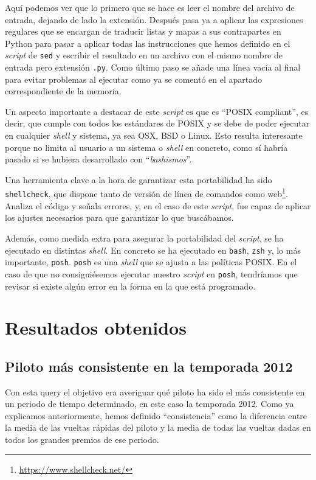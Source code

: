 \documentclass[12pt,twoside,titlepage]{report}
\newcommand{\quotes}[1]{``#1''}
\begin{document}
Aquí podemos ver que lo primero que se hace es leer el nombre del archivo de entrada, dejando de lado la extensión. Después pasa ya a aplicar las expresiones regulares que se encargan de traducir listas y mapas a sus contrapartes en Python para pasar a aplicar todas las instrucciones que hemos definido en el \textit{script} de \texttt{sed} y escribir el resultado en un archivo con el mismo nombre de entrada pero extensión \texttt{.py}. Como último paso se añade una línea vacía al final para evitar problemas al ejecutar como ya se comentó en el apartado correspondiente de la memoria.

Un aspecto importante a destacar de este \textit{script} es que es \quotes{POSIX compliant}, es decir, que cumple con todos los estándares de POSIX y se debe de poder ejecutar en cualquier \textit{shell} y sistema, ya sea OSX, BSD o Linux. Esto resulta interesante porque no limita al usuario a un sistema o \textit{shell} en concreto, como sí habría pasado si se hubiera desarrollado con \quotes{\textit{bashismos}}.

Una herramienta clave a la hora de garantizar esta portabilidad ha sido \texttt{shellcheck}, que dispone tanto de versión de línea de comandos como web\footnote{\url{https://www.shellcheck.net/}}. Analiza el código y señala errores, y, en el caso de este \textit{script}, fue capaz de aplicar los ajustes necesarios para que garantizar lo que buscábamos.

Además, como medida extra para asegurar la portabilidad del \textit{script}, se ha ejecutado en distintas \textit{shell}. En concreto se ha ejecutado en \texttt{bash}, \texttt{zsh} y, lo más importante, \texttt{posh}. \texttt{posh} es una \textit{shell} que se ajusta a las políticas POSIX. En el caso de que no consiguiésemos ejecutar nuestro \textit{script} en \texttt{posh}, tendríamos que revisar si existe algún error en la forma en la que está programado.

\chapter{Resultados obtenidos}
\label{sec:apendice2}

\section{Piloto más consistente en la temporada 2012}

Con esta query el objetivo era averiguar qué piloto ha sido el más consistente en un periodo de tiempo determinado, en este caso la temporada 2012. Como ya explicamos anteriormente, hemos definido \quotes{consistencia} como la diferencia entre la media de las vueltas rápidas del piloto y la media de todas las vueltas dadas en todos los grandes premios de ese periodo.
\end{document}
